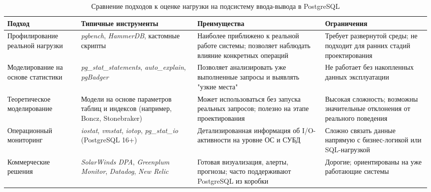\begin{table}[H]
\centering
\caption{Сравнение подходов к оценке нагрузки на подсистему ввода-вывода в PostgreSQL}
\small
\begin{tabularx}{\textwidth}{@{}p{3.5cm}X>{\raggedright\arraybackslash}p{4.2cm}>{\raggedright\arraybackslash}p{3.5cm}@{}}
\toprule
\textbf{Подход} & \textbf{Типичные инструменты} & \textbf{Преимущества} & \textbf{Ограничения} \\
\midrule
Профилирование реальной нагрузки & \textit{pgbench}, \textit{HammerDB}, кастомные скрипты & Наиболее приближено к реальной работе системы; позволяет наблюдать влияние конкретных операций & Требует развернутой среды; не подходит для ранних стадий проектирования \\
\addlinespace
Моделирование на основе статистики & \textit{pg\_stat\_statements}, \textit{auto\_explain}, \textit{pgBadger} & Позволяет анализировать уже выполненные запросы и выявлять "узкие места" & Не работает без накопленных данных эксплуатации \\
\addlinespace
Теоретическое моделирование & Модели на основе параметров таблиц и индексов (например, Boncz, Stonebraker) & Может использоваться без запуска реальных запросов; полезно на этапе проектирования & Высокая сложность; возможны значительные отклонения от реального поведения \\
\addlinespace
Операционный мониторинг & \textit{iostat}, \textit{vmstat}, \textit{iotop}, \textit{pg\_stat\_io} (PostgreSQL 16+) & Детализированная информация об I/O-активности на уровне ОС и СУБД & Сложно связать данные напрямую с бизнес-логикой или SQL-нагрузкой \\
\addlinespace
Коммерческие решения & \textit{SolarWinds DPA}, \textit{Greenplum Monitor}, \textit{Datadog}, \textit{New Relic} & Готовая визуализация, алерты, прогнозы; часто поддерживают PostgreSQL из коробки & Дорогие; ориентированы на уже работающие системы \\
\bottomrule
\end{tabularx}
\label{tab:io_approaches}
\end{table}
